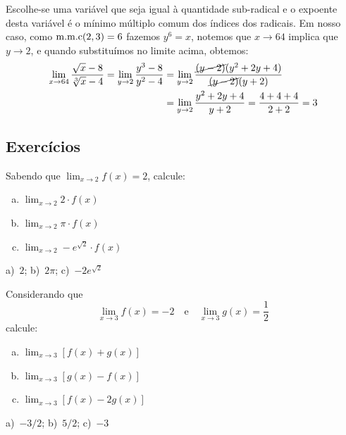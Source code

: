 \cleardoublepage\documentclass[../main.tex]{subfiles}
\begin{document}
\begin{exeresol}
\begin{compactenum}[a)]
\begin{resol}
Escolhe-se uma variável que seja igual à quantidade sub-radical e o expoente desta variável é o mínimo múltiplo comum dos índices dos radicais. Em nosso caso, como \( {\rm m.m.c}(2,3)=6\) fazemos \(y^6=x\), notemos que \(x\to 64\) implica que \(y\to 2\), e quando substituímos no limite acima, obtemos:
\begin{align*}
    \lim\limits_{x \to 64} \dfrac{\sqrt{x}-8}{\sqrt[3]{x}-4}= \lim\limits_{y\rightarrow 2} \dfrac{y^3-8}{y^2-4}
     &=\lim\limits_{y \to 2} \dfrac{\cancel{(y-2)}(y^2+2y+4)}{\cancel{(y-2)}(y+2)}\\&= \lim\limits_{y \to 2} \dfrac{y^2+2y+4}{y+2}= \dfrac{4+4+4}{2+2}=3
\end{align*}
\end{resol}
\end{compactenum}

\end{exeresol}
\subsection{Exercícios}

\begin{exer}
  Sabendo que $\displaystyle    \lim_{x\to 2} f(x) = 2$,   calcule:
  \begin{multicols}{3}
   \begin{enumerate}[a)]
  \item $\displaystyle \lim_{x\to 2} 2\cdot f(x)$
  \item $\displaystyle \lim_{x\to 2} \pi\cdot f(x)$
  \item $\displaystyle \lim_{x\to 2} -e^{\sqrt{2}}\cdot f(x)$
  \end{enumerate}
  \end{multicols}
 \end{exer}
\begin{resp}
  a)~$2$; b)~$2\pi$; c)~$-2e^{\sqrt{2}}$
\end{resp}

\begin{exer}
  Considerando que
  \begin{equation*}
    \lim_{x\to 3} f(x) = -2\quad\text{e}\quad\lim_{x\to 3} g(x) = \frac{1}{2}
  \end{equation*}
  calcule:
  \begin{enumerate}[a)]
  \item $\displaystyle\lim_{x\to 3} [f(x)+g(x)]$
  \item $\displaystyle\lim_{x\to 3} [g(x)-f(x)]$
  \item $\displaystyle\lim_{x\to 3} [f(x)-2g(x)]$
  \end{enumerate}
\end{exer}
\begin{resp}
  a)~$-3/2$; b)~$5/2$; c)~$-3$
\end{resp}
\end{document}
